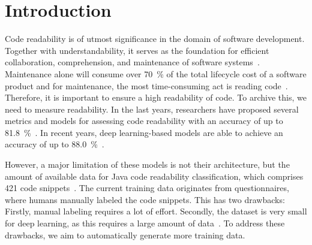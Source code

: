 \documentclass[%
class=scrreprt,
chapterprefix=false,%
open=right,%
twoside=false,%
paper=a4,%
logofile={Logo\_zentral\_farbig\_EN.png},%
thesistype=master,%
UKenglish,%
]{se2thesis}
\theoremstyle{definition}
\newcommand{\citeclassicmodels}{\cite{buse2009learning, posnett2011simpler, dorn2012general, scalabrino2018comprehensive}\xspace}
\newcommand{\citedeepmodels}{\cite{mi2018inception, mi2018improving, sharma2020egan, mi2022towards, mi2022rank, mi2023graph}\xspace}
\newcommand{\citeolddataset}{\cite{buse2009learning, dorn2012general, scalabrino2018comprehensive}\xspace}
\begin{document}
	\mainmatter
	
	\tableofcontents

\pagebreak
\section{Introduction} \label{Introduction}

	Code readability is of utmost significance in the domain of software development.
	Together with understandability, it serves as the foundation for efficient collaboration, comprehension, and maintenance of software systems~\cite{posnett2011simpler, aggarwal2002integrated}. 
	Maintenance alone will consume over 70~\% of the total lifecycle cost of a software product and for maintenance, the most time-consuming act is reading code~\cite{buse2009learning, deimel1985uses, rugaber2000use, boehm2001defect}.
	Therefore, it is important to ensure a high readability of code. To archive this, we need to measure readability.
	In the last years, researchers have proposed several metrics and models for assessing code readability with an accuracy of up to 81.8~\%~\citeclassicmodels. In recent years, deep learning-based models are able to achieve an accuracy of up to 88.0~\%~\citedeepmodels.
	
	However, a major limitation of these models is not their architecture, but the amount of available data for Java code readability classification, which comprises 421 code snippets~\citeolddataset. The current training data originates from questionnaires, where humans manually labeled the code snippets. This has two drawbacks: Firstly, manual labeling requires a lot of effort.
	Secondly, the dataset is very small for deep learning, as this requires a large amount of data~\cite{hestness2017deep}.
	To address these drawbacks, we aim to automatically generate more training data.
	
	
\end{document}
